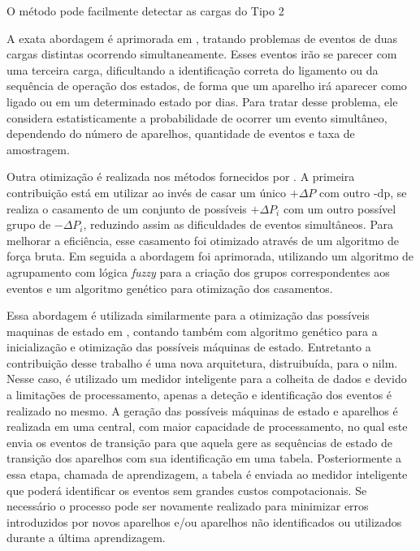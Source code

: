 O método pode facilmente detectar as cargas do Tipo 2

A exata abordagem é aprimorada em
\cite{nilm_cole_extra_info_surge_1998_15}, tratando problemas de eventos de
duas cargas distintas ocorrendo simultaneamente. Esses eventos irão se
parecer com uma terceira carga, dificultando a identificação correta
do ligamento ou da sequência de operação dos estados, de forma que um
aparelho irá aparecer como ligado ou em um determinado estado por
dias. Para tratar desse problema, ele considera estatisticamente a
probabilidade de ocorrer um evento simultâneo, dependendo do número de
aparelhos, quantidade de eventos e taxa de amostragem.

Outra otimização é realizada nos métodos fornecidos por 
\cite{nilm_baranski_genetic_base_2003_19,nilm_baranski_genetic_detalhado_2004_20,
nilm_baranski_summary_2004_21}.
A primeira contribuição está em utilizar ao invés de casar um único $+\Delta{P}$ 
com outro -\acrshort{dp}, se realiza o casamento
de um conjunto de possíveis $+\Delta{P}_i$ com um outro possível grupo de
$-\Delta{P}_i$, reduzindo assim as dificuldades de eventos simultâneos.
Para melhorar a eficiência, esse casamento foi otimizado através 
de um algoritmo de força bruta. Em seguida a abordagem foi aprimorada,
utilizando um algoritmo de agrupamento com lógica \emph{fuzzy} para a criação
dos grupos correspondentes aos eventos e um algoritmo genético para otimização
dos casamentos.

Essa abordagem é utilizada similarmente para a otimização das
possíveis maquinas de estado em \cite{nilm_bergman_distribuido_2011},
contando também com algoritmo genético para a inicialização e
otimização das possíveis máquinas de estado. Entretanto a
contribuição desse trabalho é uma nova arquitetura, distruibuída, para
o \gls{nilm}. Nesse caso, é utilizado um medidor inteligente para a
colheita de dados e devido a limitações de processamento, apenas a
deteção e identificação dos eventos é realizado no mesmo. A geração
das possíveis máquinas de estado e aparelhos é realizada em uma
central, com maior capacidade de processamento, no qual este envia os
eventos de transição para que aquela gere as sequências de estado de
transição dos aparelhos com sua identificação em uma tabela.
Posteriormente a essa etapa, chamada de aprendizagem, a tabela é
enviada ao medidor inteligente que poderá identificar os eventos sem
grandes custos compotacionais. Se necessário o processo pode ser
novamente realizado para minimizar erros introduzidos por novos
aparelhos e/ou aparelhos não identificados ou utilizados durante a
última aprendizagem.

